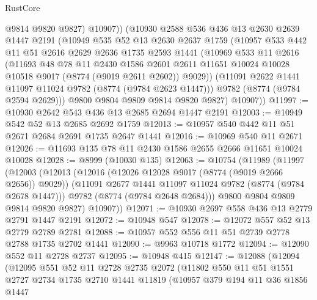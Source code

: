 \begin{lexlean}{RustCore}
\begin{coremodule}
            @9814
            @9820
            @9827)
          @10907))
      (@10930
        @2588
        @536
        @436
        @13
        @2630
        @2639
        @1447
        @2191
        (@10949
          @535
          @52
          @13
          @2630
          @2637
          @1759
          (@10957
            @533
            @442
            @11
            @51
            @2616
            @2629
            @2636
            @1735
            @2593
            @1441
            (@10969
              @533
              @11
              @2616
              (@11693
                @48
                @78
                @11
                @2430
                @1586
                @2601
                @2611
                @11651
                @10024
                @10028
                @10518
                @9017
                (@8774 (@9019 @2611 @2602))
                @9029))
            (@11091 @2622 @1441 @11097 @11024 @9782 (@8774 (@9784 @2623 @1447)))
            @9782
            (@8774 (@9784 @2594 @2629)))
          @9800
          @9804
          @9809
          @9814
          @9820
          @9827)
        @10907))
@11997 := @10930 @2642 @543 @436 @13 @2685 @2694 @1447 @2191
@12003 := @10949 @542 @52 @13 @2685 @2692 @1759
@12013 := @10957 @540 @442 @11 @51 @2671 @2684 @2691 @1735 @2647 @1441
@12016 := @10969 @540 @11 @2671
@12026 := @11693 @135 @78 @11 @2430 @1586 @2655 @2666 @11651 @10024 @10028
@12028 := @8999 (@10030 @135)
@12063 := @10754
    (@11989
      (@11997
        (@12003
          (@12013
            (@12016 (@12026 @12028 @9017 (@8774 (@9019 @2666 @2656)) @9029))
            (@11091 @2677 @1441 @11097 @11024 @9782 (@8774 (@9784 @2678 @1447)))
            @9782
            (@8774 (@9784 @2648 @2684)))
          @9800
          @9804
          @9809
          @9814
          @9820
          @9827)
        @10907))
@12071 := @10930 @2697 @558 @436 @13 @2779 @2791 @1447 @2191
@12072 := @10948 @547
@12078 := @12072 @557 @52 @13 @2779 @2789 @2781
@12088 := @10957 @552 @556 @11 @51 @2739 @2778 @2788 @1735 @2702 @1441
@12090 := @9963 @10718 @1772
@12094 := @12090 @552 @11 @2728 @2737
@12095 := @10948 @415
@12147 := @12088
    (@12094
      (@12095
        @551
        @52
        @11
        @2728
        @2735
        @2072
        (@11802
          @550
          @11
          @51
          @1551
          @2727
          @2734
          @1735
          @2710
          @1441
          @11819
          (@10957
            @379
            @194
            @11
            @36
            @1856
            @1447

\end{coremodule}
\end{lexlean}
